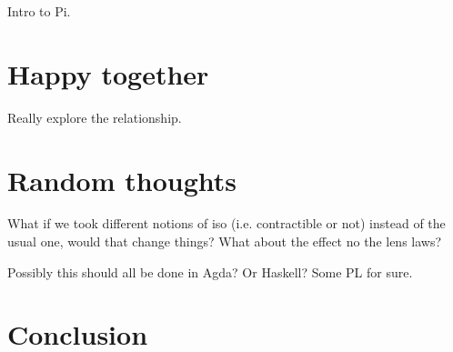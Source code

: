 \documentclass[a4paper]{article}
\begin{document}
Intro to Pi.

\section{Happy together}

Really explore the relationship.

\section{Random thoughts}

What if we took different notions of iso (i.e. contractible or not)
instead of the usual one, would that change things? What about the 
effect no the lens laws?

Possibly this should all be done in Agda? Or Haskell? Some PL for sure.

\section{Conclusion}

 

\end{document}

